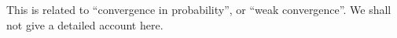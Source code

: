 This is related to ``convergence in probability'', or ``weak convergence''.
We shall not give a detailed account here.

%
%
%
%
%
%
%
%

%
%
%
%
